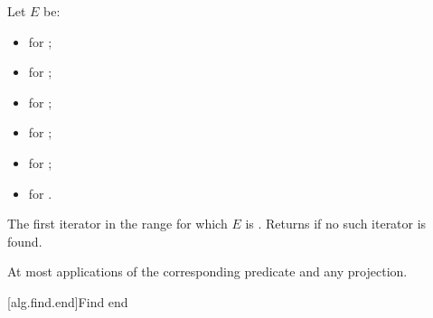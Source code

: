 \begin{itemdescr}
\pnum
Let $E$ be:
\begin{itemize}
\item {} for ;
\item {} for ;
\item {} for ;
\item {} for ;
\item {} for ;
\item {} for .
\end{itemize}

\pnum
\returns
The first iterator  in the range 
for which $E$ is .
Returns  if no such iterator is found.

\pnum
\complexity
At most  applications
of the corresponding predicate and any projection.
\end{itemdescr}

[alg.find.end]{Find end}

